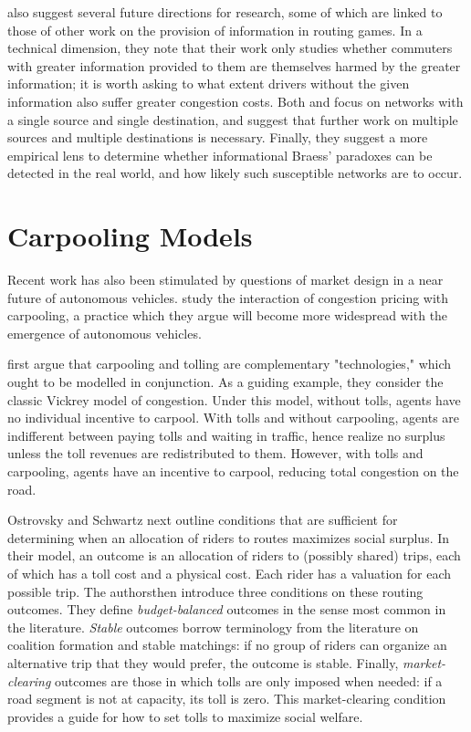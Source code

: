 \documentclass[JEL]{AEA}
\begin{document}
\cite{acemoglu-2016} also suggest several future directions for research, some of which are linked to those of other work on the provision of information in routing games. In a technical dimension, they note that their work only studies whether commuters with greater information provided to them are themselves harmed by the greater information; it is worth asking to what extent drivers without the given information also suffer greater congestion costs. Both \cite{das-2017} and \cite{acemoglu-2016} focus on networks with a single source and single destination, and suggest that further work on multiple sources and multiple destinations is necessary. Finally, they suggest a more empirical lens to determine whether informational Braess' paradoxes can be detected in the real world, and how likely such susceptible networks are to occur.

\section{Carpooling Models}
\label{carpooling-models}

Recent work has also been stimulated by questions of market design in a near future of autonomous vehicles. \cite{ostrovsky-2018} study the interaction of congestion pricing with carpooling, a practice which they argue will become more widespread with the emergence of autonomous vehicles.

\cite{ostrovsky-2018} first argue that carpooling and tolling are complementary "technologies," which ought to be modelled in conjunction. As a guiding example, they consider the classic Vickrey model of congestion. Under this model, without tolls, agents have no individual incentive to carpool. With tolls and without carpooling, agents are indifferent between paying tolls and waiting in traffic, hence realize no surplus unless the toll revenues are redistributed to them. However, with tolls and carpooling, agents have an incentive to carpool, reducing total congestion on the road.

Ostrovsky and Schwartz next outline conditions that are sufficient for determining when an allocation of riders to routes maximizes social surplus. In their model, an outcome is an allocation of riders to (possibly shared) trips, each of which has a toll cost and a physical cost. Each rider has a valuation for each possible trip. The authorsthen introduce three conditions on these routing outcomes. They define \textit{budget-balanced} outcomes in the sense most common in the literature. \textit{Stable} outcomes borrow terminology from the literature on coalition formation and stable matchings: if no group of riders can organize an alternative trip that they would prefer, the outcome is stable. Finally, \textit{market-clearing} outcomes are those in which tolls are only imposed when needed: if a road segment is not at capacity, its toll is zero. This market-clearing condition provides a guide for how to set tolls to maximize social welfare. 
\end{document}
